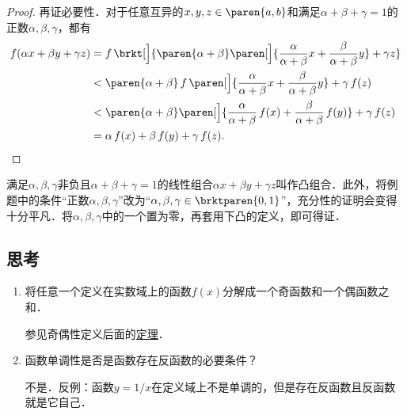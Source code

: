 \begin{example*}
\begin{proof}
    再证必要性．对于任意互异的\(x, y, z \in \paren{a,b}\)和满足\(\alpha+\beta+\gamma=1\)的正数\(\alpha, \beta, \gamma\)，都有
    \[
      \begin{split}
        f(\alpha x + \beta y + \gamma z)
        &= f\,\brkt[\Big]{\paren{\alpha+\beta}\paren[\Big]{\frac{\alpha}{\alpha+\beta} x + \frac{\beta}{\alpha+\beta} y} + \gamma z} \\
        &< \paren{\alpha+\beta}\,f\,\paren[\Big]{\frac{\alpha}{\alpha+\beta} x + \frac{\beta}{\alpha+\beta} y} + \gamma\,f(z) \\
        &< \paren{\alpha+\beta}\paren[\Big]{\frac{\alpha}{\alpha+\beta}\,f(x) + \frac{\beta}{\alpha+\beta}\,f(y)} + \gamma\,f(z) \\
        &= \alpha\,f(x) + \beta\,f(y) + \gamma\,f(z). \qedhere
      \end{split}
    \]

  \end{proof}
  \begin{remark}
    满足\(\alpha, \beta, \gamma\)非负且\(\alpha + \beta + \gamma = 1\)的线性组合\(\alpha x + \beta y + \gamma z\)叫作凸组合\cite{ConvexCombWiki}．此外，将例题中的条件“正数\(\alpha, \beta, \gamma\)”改为“\(\alpha, \beta, \gamma \in \brktparen{0,1}\)”，充分性的证明会变得十分平凡．将\(\alpha, \beta, \gamma\)中的一个置为零，再套用下凸的定义，即可得证．
  \end{remark}
\end{example*}

\subsection*{思考}

\begin{enumerate}
\item 将任意一个定义在实数域上的函数\(f(x)\)分解成一个奇函数和一个偶函数之和．

  \ifshowsolp
    参见奇偶性定义后面的\hyperlink{T:evenodd}{定理}．
  \fi

\item 函数单调性是否是函数存在反函数的必要条件？

  \ifshowsolp
    不是．反例：函数\(y = 1/x\)在定义域上不是单调的，但是存在反函数且反函数就是它自己．
  \fi
\end{enumerate}

